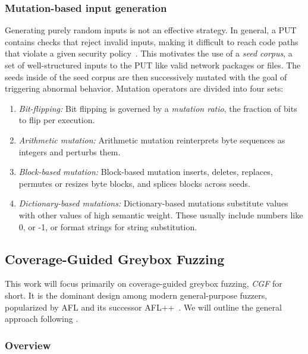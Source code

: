 \subsubsection{Mutation-based input generation}

Generating purely random inputs is not an effective strategy.
In general, a PUT contains checks that reject invalid inputs, making it
difficult to reach code paths that violate a given security policy~\cite{manes_art_2019}.
This motivates the use of a \emph{seed corpus}, a set of well-structured inputs
to the PUT like valid network packages or files.
The seeds inside of the seed corpus are then successively mutated with the goal
of triggering abnormal behavior.
Mutation operators are divided into four sets:

\begin{enumerate}
  \item \emph{Bit-flipping:}
    Bit flipping is governed by a \emph{mutation ratio}, the fraction of bits to
    flip per execution.

  \item \emph{Arithmetic mutation:}
    Arithmetic mutation reinterprets byte sequences as integers and perturbs them.

  \item \emph{Block-based mutation:}
    Block-based mutation inserts, deletes, replaces, permutes or resizes byte blocks,
    and splices blocks across seeds.

  \item \emph{Dictionary-based mutations:}
    Dictionary-based mutations substitute values with other values of high semantic
    weight. These usually include numbers like 0, or -1, or format strings for
    string substitution.
\end{enumerate}

\subsection{Coverage-Guided Greybox Fuzzing}\label{sec:fuzzing-cgf}

This work will focus primarily on coverage-guided greybox fuzzing, \emph{CGF} for short.
It is the dominant design among modern general-purpose fuzzers, popularized by
AFL  and its successor
AFL++~\cite{fioraldi_afl_nodate}.
We will outline the general approach following \textcite{bohme_coverage-based_2016}.

\subsubsection{Overview}

